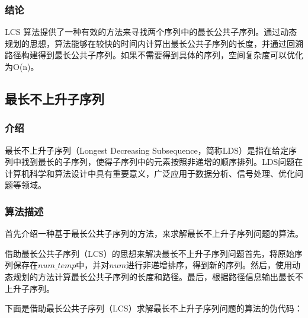 \documentclass[lang=cn,11pt,a4paper]{elegantpaper}
\begin{document}
\subsubsection{结论}
LCS 算法提供了一种有效的方法来寻找两个序列中的最长公共子序列。通过动态规划的思想，算法能够在较快的时间内计算出最长公共子序列的长度，并通过回溯路径构建得到最长公共子序列。如果不需要得到具体的序列，空间复杂度可以优化为O(n)。

\subsection{最长不上升子序列}

\subsubsection{介绍}
最长不上升子序列（Longest Decreasing Subsequence，简称LDS）是指在给定序列中找到最长的子序列，使得子序列中的元素按照非递增的顺序排列。LDS问题在计算机科学和算法设计中具有重要意义，广泛应用于数据分析、信号处理、优化问题等领域。

\subsubsection{算法描述}

首先介绍一种基于最长公共子序列的方法，来求解最长不上升子序列问题的算法。

借助最长公共子序列（LCS）的思想来解决最长不上升子序列问题首先，将原始序列保存在$num\_temp$中，并对$num$进行非递增排序，得到新的序列。然后，使用动态规划的方法计算最长公共子序列的长度和路径。最后，根据路径信息输出最长不上升子序列。

下面是借助最长公共子序列（LCS）求解最长不上升子序列问题的算法的伪代码：
\end{document}
